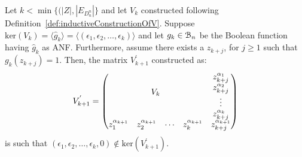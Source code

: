 \documentclass[11pt]{llncs}
\begin{document}
\begin{proposition}\label{prop:swappingElementOfZToReduceKer}
    Let $k < \min\{(|Z|, |E_{D_n^n}|\}$ and let $V_k$ constructed following Definition~\ref{def:inductiveConstructionOfV}. 
    Suppose $\text{ker}(V_k) = \langle \hat{g}_k \rangle=\langle (\epsilon_1, \epsilon_2, \dots, \epsilon_k) \rangle $ and let $g_k\in \mathcal{B}_{n}$ be the Boolean function having $\hat{g}_k$ as ANF. 
    Furthermore, assume there exists a $z_{k+j}$, for $j\geq 1$ such that $g_k(z_{k+j}) = 1$. Then, the matrix $V^{'}_{k+1}$ constructed as:
    \begin{align*}
        V^{'}_{k+1} = 
        \begin{pmatrix}
        \multicolumn{4}{c}{\multirow{4}{*}{$V_{k}$}} & z_{k+j}^{\alpha_{1}}\\
        & & & & z_{k+j}^{\alpha_{2}}\\
        & & & & \vdots\\
        & & & & z_{k+j}^{\alpha_{k}}\\
        z_{1}^{\alpha_{k+1}} & z_{2}^{\alpha_{k+1}}& \cdots & z_{k}^{\alpha_{k+1}} & z_{k+j}^{\alpha_{k+1}}
    \end{pmatrix}
    \end{align*}
    is such that $(\epsilon_1, \epsilon_2, \dots, \epsilon_k, 0) \not\in \text{ker}(V^{'}_{k+1})$.
\end{proposition}
\end{document}
